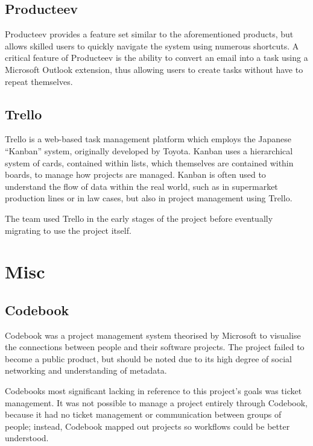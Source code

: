 \documentclass[a4paper]{l3proj}
\begin{document}
\subsection{Producteev}
\label{producteev}

Producteev \cite{site:producteev} provides a feature set similar to the aforementioned products, but allows skilled users to quickly navigate the system using numerous shortcuts. A critical feature of Producteev is the ability to convert an email into a task using a Microsoft Outlook extension, thus allowing users to create tasks without have to repeat themselves. 

\subsection{Trello}
\label{trello}

Trello \cite{site:trello} is a web-based task management platform which employs the Japanese ``Kanban''
system, originally developed by Toyota. Kanban uses a hierarchical system of
cards, contained within lists, which themselves are contained within boards, to
manage how projects are managed. Kanban is often used to understand the flow of data within the real world, such as in supermarket production lines or in law cases, but also in project management using Trello.

The team used Trello in the early stages of the project before eventually migrating to use the project itself.

\section{Misc}

\subsection{Codebook}
\label{codebook}
Codebook \cite{site:codebook} was a project management system theorised by Microsoft to visualise the connections between people and their software projects. The project failed to become a public product, but should be noted due to its high degree of social networking and understanding of metadata.

Codebooks most significant lacking in reference to this project’s goals was ticket management. It was not possible to manage a project entirely through Codebook, because it had no ticket management or communication between groups of people; instead, Codebook mapped out projects so workflows could be better understood.
\end{document}
